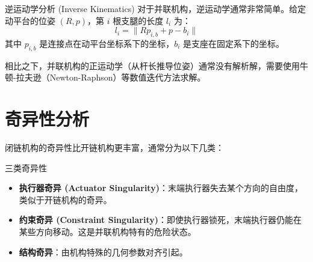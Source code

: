 \begin{formulabox}{逆运动学分析 (Inverse Kinematics)}
对于并联机构，逆运动学通常非常简单。给定动平台的位姿 $(R, p)$，第 $i$ 根支腿的长度 $l_i$ 为：
\begin{equation}
    l_i = \| R p_{i,b} + p - b_i \|
\end{equation}
其中 $p_{i,b}$ 是连接点在动平台坐标系下的坐标，$b_i$ 是支座在固定系下的坐标。
\end{formulabox}

相比之下，并联机构的正运动学（从杆长推导位姿）通常没有解析解，需要使用牛顿-拉夫逊（Newton-Raphson）等数值迭代方法求解。

\section{奇异性分析}
闭链机构的奇异性比开链机构更丰富，通常分为以下几类：

\begin{thoughtbox}{三类奇异性}
\begin{itemize}
    \item \textbf{执行器奇异 (Actuator Singularity)}：末端执行器失去某个方向的自由度，类似于开链机构的奇异。
    \item \textbf{约束奇异 (Constraint Singularity)}：即使执行器锁死，末端执行器仍能在某些方向移动。这是并联机构特有的危险状态。
    \item \textbf{结构奇异}：由机构特殊的几何参数对齐引起。
\end{itemize}
\end{thoughtbox}



\clearpage %